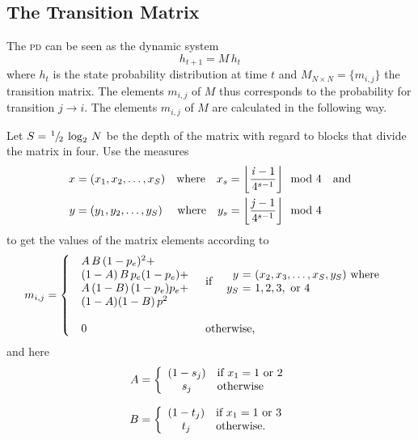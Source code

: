 \subsection{The Transition Matrix}
The \textsc{pd} can be seen as the dynamic system
\begin{equation*}
h_{t+1} = M\, h_t
\end{equation*}
where $h_t$ is the state probability distribution at time $t$ and $M_{N\times N}= \{ m_{i,j}\}$ the transition matrix. The elements $m_{i, j}$ of $M$ thus corresponds to the probability for transition $j\rightarrow i$. The elements $m_{i, j}$ of $M$ are calculated in the following way.\mypar

Let $S = \hspace{1pt} ^{1} \hspace{-0.8pt} / \hspace{-1.5pt} _{2} \hspace{2pt}\log_2\, N$ be the depth of the matrix with regard to blocks that divide the matrix in four. Use the measures
\begin{align*}
x &= (x_1, x_2, \dots, x_S) &\textrm{where} \quad x_s &= \floor{\frac{\makebox[1ex]{\textit{i}}-1}{4^{s-1}}} \mod 4 \quad \textrm{and}\\
y &= (y_1, y_2, \dots, y_S) &\textrm{where} \quad y_s &= \floor{\frac{\makebox[1ex]{\textit{j}}-1}{4^{s-1}}} \mod 4
\end{align*}
to get the values of the matrix elements according to
\begin{equation*}
m_{i, j} = \left\{
\begin{array}{ll}
\begin{array}{l}
A\,B\,(1-p_e)^2 + \\
(1 - A)\,B\, p_e(1-p_e) + \\
A\,(1-B)\,(1 - p_e)p_e + \\
(1-A)(1-B)\,p^2 \\[\baselineskip]
\end{array}
 & \textrm{if~}
\begin{array}{r@{~=~}l}
\quad y & (x_2, x_3, \dots, x_S, y_S) \textrm{~where~} \\
    y_S & 1, 2, 3, \textrm{~or~} 4
\end{array}
\\~\vspace{-0.5\baselineskip}~\\
\begin{array}{l}
0
\end{array}
 & \textrm{otherwise,}
\end{array}
\right.
\end{equation*}
and here
\begin{align*}
A &= \left\{%
\begin{array}{cl}%
(1-s_j) & \textrm{if~} x_1 = 1 \textrm{~or~} 2 \\
s_j & \textrm{otherwise}
\end{array}%
\right. \\[0.5\baselineskip]
B &= \left\{%
\begin{array}{cl}%
(1-t_j) & \textrm{if~} x_1 = 1 \textrm{~or~} 3 \\
t_j & \textrm{otherwise.}%
\end{array}%
\right.%
\end{align*}

